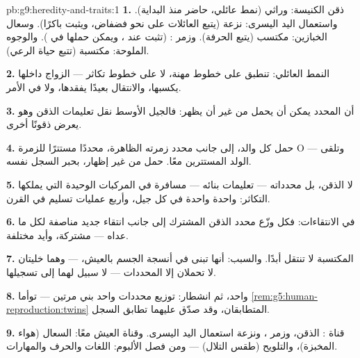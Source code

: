 \begin{solution}{pb:g9:heredity-and-traits:1}
\textbf{1.} ذقن الكنيسة: وراثي (نمط عائلي، حاضر منذ
البداية). واستعمال اليد اليسرى: نزعة  (يتبع
العائلات على نحو فضفاض، ويثبت باكرًا). وسعال الخبازين:
مكتسب (يتبع الحرفة). وزمر :  (تثبت عند
، ويمكن حملها في ). والوجوه الملوحة:
مكتسبة (تتبع حياة الرعي).

\textbf{2.}  النمط العائلي:  تنطبق على خطوط
مهنة، لا على خطوط تكاثر --- الزواج داخلها يكسبها،
والانتقال بعيدًا يفقدها، ولا  في الأمر.

\textbf{3.} أن المحدد يمكن أن يحمل من غير أن يظهر:
فالجيل الأوسط نقل تعليمات الذقن وهو يعرض ذقونًا أخرى.

\textbf{4.} حمل كل والد، إلى جانب محدد زمرته الظاهرة،
محددًا مستترًا للزمرة O --- وتلقى الولد المستترين معًا.
حمل من غير إظهار، بحبر السجل نفسه.

\textbf{5.} لا الذقن، بل محدداته --- تعليمات بنائه ---
مسافرة في المركبات الوحيدة التي يملكها التكاثر: 
واحدة  واحدة في كل جيل، وأربع عمليات تسليم في
القرن.

\textbf{6.} في الانتقاءات: فكل  وزّع محدد الذقن
المشترك إلى جانب انتقاء جديد مناصفة لكل ما عداه ---
 مشتركة، وأيد مختلفة.

\textbf{7.}  المكتسبة لا تنتقل أبدًا. والسبب:
أنها تبنى في أنسجة الجسم بالعيش،  --- وهما
خليتان لا تحملان إلا المحددات --- لا سبيل لهما إلى
تسجيلها.

\textbf{8.}  واحد، ثم انشطار: توزيع محددات واحد
بني مرتين --- توأما
\cref{rem:g5:human-reproduction:twins} المتطابقان، وقد
صدّق عليهما تطابق السجل.

\textbf{9.} قناة : الذقن، وزمر ، ونزعة
استعمال اليد اليسرى. وقناة العيش معًا: السعال (هواء
المخبزة)، والتلويح (طقس التلال) --- ومن فصل الألبوم:
اللغات والحرف والمهارات.


\end{solution}

